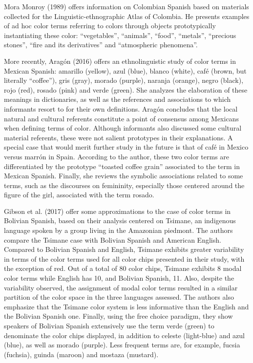 \documentclass[man]{apa6}
\theoremstyle{definition}
\theoremstyle{definition}
\theoremstyle{definition}
\theoremstyle{remark}
\begin{document}
Mora Monroy (1989) offers information on Colombian Spanish based on
materials collected for the Linguistic-ethnographic Atlas of Colombia.
He presents examples of ad hoc color terms referring to colors through
objects prototypically instantiating these color: \enquote{vegetables},
\enquote{animals}, \enquote{food}, \enquote{metals}, \enquote{precious
stones}, \enquote{fire and its derivatives} and \enquote{atmospheric
phenomena}.

More recently, Aragón (2016) offers an ethnolinguistic study of color
terms in Mexican Spanish: amarillo (yellow), azul (blue), blanco
(white), café (brown, but literally \enquote{coffee}), gris (gray),
morado (purple), naranja (orange), negro (black), rojo (red), rosado
(pink) and verde (green). She analyzes the elaboration of these meanings
in dictionaries, as well as the references and associations to which
informants resort to for their own definitions. Aragón concludes that
the local natural and cultural referents constitute a point of consensus
among Mexicans when defining terms of color. Although informants also
discussed some cultural material referents, these were not salient
prototypes in their explanations. A special case that would merit
further study in the future is that of café in Mexico versus marrón in
Spain. According to the author, these two color terms are differentiated
by the prototype \enquote{toasted coffee grain} associated to the term
in Mexican Spanish. Finally, she reviews the symbolic associations
related to some terms, such as the discourses on femininity, especially
those centered around the figure of the girl, associated with the term
rosado.

Gibson et al. (2017) offer some approximations to the case of color
terms in Bolivian Spanish, based on their analysis centered on Tsimane,
an indigenous language spoken by a group living in the Amazonian
piedmont. The authors compare the Tsimane case with Bolivian Spanish and
American English. Compared to Bolivian Spanish and English, Tsimane
exhibits greater variability in terms of the color terms used for all
color chips presented in their study, with the exception of red. Out of
a total of 80 color chips, Tsimane exhibits 8 modal color terms while
English has 10, and Bolivian Spanish, 11. Also, despite the variability
observed, the assignment of modal color terms resulted in a similar
partition of the color space in the three languages assessed. The
authors also emphasize that the Tsimane color system is less informative
than the English and the Bolivian Spanish one. Finally, using the free
choice paradigm, they show speakers of Bolivian Spanish extensively use
the term verde (green) to denominate the color chips displayed, in
addition to celeste (light-blue) and azul (blue), as well as morado
(purple). Less frequent terms are, for example, fucsia (fuchsia), guinda
(maroon) and mostaza (mustard).
\end{document}
